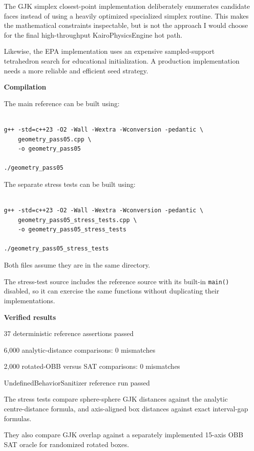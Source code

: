 The GJK simplex closest-point implementation deliberately enumerates candidate faces instead of using a heavily optimized specialized simplex routine. This makes the mathematical constraints inspectable, but is not the approach I would choose for the final high-throughput KairoPhysicsEngine hot path.

Likewise, the EPA implementation uses an expensive sampled-support tetrahedron search for educational initialization. A production implementation needs a more reliable and efficient seed strategy.

\textbf{Compilation}

The main reference can be built using:

\begin{verbatim}

g++ -std=c++23 -O2 -Wall -Wextra -Wconversion -pedantic \
    geometry_pass05.cpp \
    -o geometry_pass05

./geometry_pass05
\end{verbatim}

The separate stress tests can be built using:

\begin{verbatim}

g++ -std=c++23 -O2 -Wall -Wextra -Wconversion -pedantic \
    geometry_pass05_stress_tests.cpp \
    -o geometry_pass05_stress_tests

./geometry_pass05_stress_tests
\end{verbatim}

Both files assume they are in the same directory.

The stress-test source includes the reference source with its built-in \texttt{main()} disabled, so it can exercise the same functions without duplicating their implementations.

\textbf{Verified results}

37 deterministic reference assertions passed

6,000 analytic-distance comparisons: 0 mismatches

2,000 rotated-OBB versus SAT comparisons: 0 mismatches

UndefinedBehaviorSanitizer reference run passed

The stress tests compare sphere-sphere GJK distances against the analytic centre-distance formula, and axis-aligned box distances against exact interval-gap formulas.

They also compare GJK overlap against a separately implemented 15-axis OBB SAT oracle for randomized rotated boxes.

